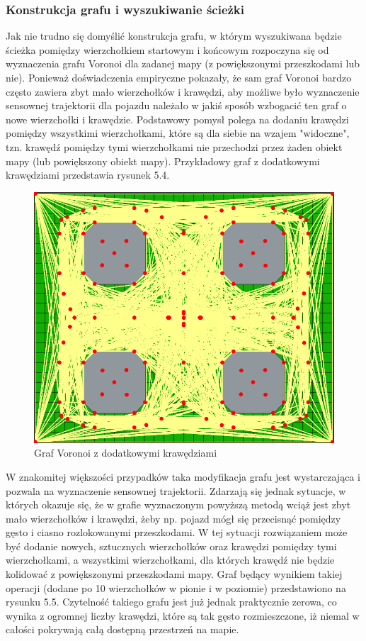 \documentclass[a4paper,11pt,twoside]{report}
\theoremstyle{definition}
\begin{document}
\subsubsection{Konstrukcja grafu i wyszukiwanie ścieżki}

Jak nie trudno się domyślić konstrukcja grafu, w którym wyszukiwana będzie ścieżka pomiędzy wierzchołkiem startowym i końcowym rozpoczyna się od wyznaczenia grafu Voronoi dla zadanej mapy (z powiększonymi przeszkodami lub nie). Ponieważ doświadczenia empiryczne pokazały, że sam graf Voronoi bardzo często zawiera zbyt mało wierzchołków i krawędzi, aby możliwe było wyznaczenie sensownej trajektorii dla pojazdu należało w jakiś sposób wzbogacić ten graf o nowe wierzchołki i krawędzie. Podstawowy pomysł polega na dodaniu krawędzi pomiędzy wszystkimi wierzchołkami, które są dla siebie na wzajem "widoczne", tzn. krawędź pomiędzy tymi wierzchołkami nie przechodzi przez żaden obiekt mapy (lub powiększony obiekt mapy). Przykładowy graf z dodatkowymi krawędziami przedstawia rysunek 5.4.

\begin{figure}[h!]
\centering
\includegraphics[scale=0.4]{fullVoronoiGraphForExpandedMap}
\caption[Graf Voronoi z dodatkowymi krawędziami]{Graf Voronoi z dodatkowymi krawędziami}
\end{figure}

W znakomitej większości przypadków taka modyfikacja grafu jest wystarczająca i pozwala na wyznaczenie sensownej trajektorii. Zdarzają się jednak sytuacje, w których okazuje się, że w grafie wyznaczonym powyższą metodą wciąż jest zbyt mało wierzchołków i krawędzi, żeby np. pojazd mógł się przecisnąć pomiędzy gęsto i ciasno rozlokowanymi przeszkodami. W tej sytuacji rozwiązaniem może być dodanie nowych, sztucznych wierzchołków oraz krawędzi pomiędzy tymi wierzchołkami, a wszystkimi wierzchołkami, dla których krawędź nie będzie kolidować z powiększonymi przeszkodami mapy. Graf będący wynikiem takiej operacji (dodane po 10 wierzchołków w pionie i w poziomie) przedstawiono na rysunku 5.5. Czytelność takiego grafu jest już jednak praktycznie zerowa, co wynika z ogromnej liczby krawędzi, które są tak gęsto rozmieszczone, iż niemal w całości pokrywają całą dostępną przestrzeń na mapie.
\end{document}
